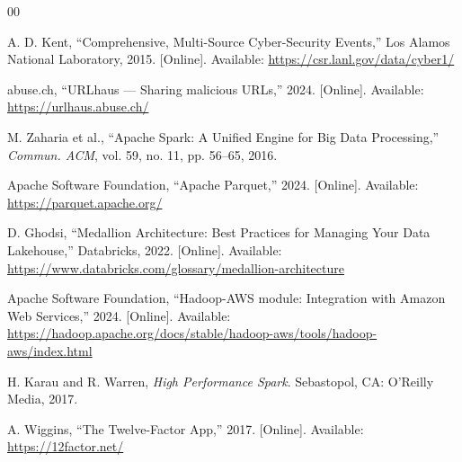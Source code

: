 \documentclass[conference]{IEEEtran}
\begin{document}
\begin{thebibliography}{00}

 A. D. Kent, ``Comprehensive, Multi-Source Cyber-Security Events,'' Los Alamos National Laboratory, 2015. [Online]. Available: \url{https://csr.lanl.gov/data/cyber1/}

 abuse.ch, ``URLhaus --- Sharing malicious URLs,'' 2024. [Online]. Available: \url{https://urlhaus.abuse.ch/}

 M. Zaharia et al., ``Apache Spark: A Unified Engine for Big Data Processing,'' \textit{Commun. ACM}, vol. 59, no. 11, pp. 56--65, 2016.

 Apache Software Foundation, ``Apache Parquet,'' 2024. [Online]. Available: \url{https://parquet.apache.org/}

 D. Ghodsi, ``Medallion Architecture: Best Practices for Managing Your Data Lakehouse,'' Databricks, 2022. [Online]. Available: \url{https://www.databricks.com/glossary/medallion-architecture}

 Apache Software Foundation, ``Hadoop-AWS module: Integration with Amazon Web Services,'' 2024. [Online]. Available: \url{https://hadoop.apache.org/docs/stable/hadoop-aws/tools/hadoop-aws/index.html}

 H. Karau and R. Warren, \textit{High Performance Spark}. Sebastopol, CA: O'Reilly Media, 2017.

 A. Wiggins, ``The Twelve-Factor App,'' 2017. [Online]. Available: \url{https://12factor.net/}

\end{thebibliography}
\end{document}
